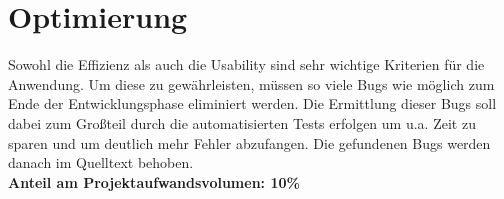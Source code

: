 \section{Optimierung}
Sowohl die Effizienz als auch die Usability sind sehr wichtige Kriterien für die Anwendung. Um diese zu gewährleisten, müssen so viele Bugs wie möglich zum Ende der Entwicklungsphase eliminiert werden. Die Ermittlung dieser Bugs soll dabei zum Großteil durch die automatisierten Tests erfolgen um u.a. Zeit zu sparen und um deutlich mehr Fehler abzufangen. Die gefundenen Bugs werden danach im Quelltext behoben. \\
\textbf{Anteil am Projektaufwandsvolumen: 10\%}
